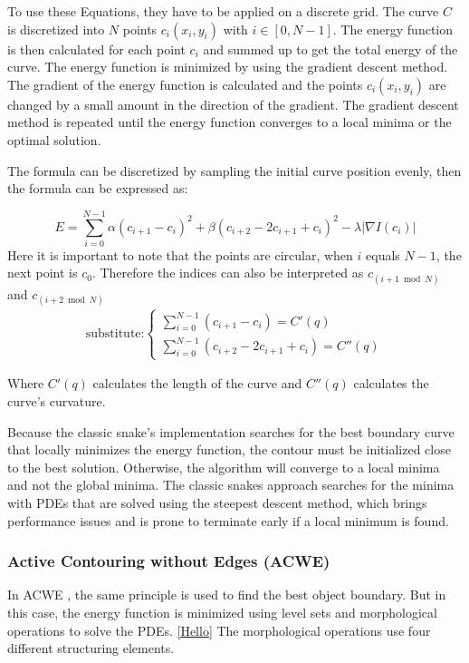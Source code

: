 To use these Equations, they have to be applied on a discrete grid. The curve $C$ is discretized into $N$ points  $c_i(x_i,y_i)$ with $i \in [0, N-1]$. The energy function is then calculated for each point $c_i$ and summed up to get the total energy of the curve. The energy function is minimized by using the gradient descent method. The gradient of the energy function is calculated and the points $c_i(x_i,y_i)$ are changed by a small amount in the direction of the gradient. The gradient descent method is repeated until the energy function converges to a local minima or the optimal solution. 

The formula can be discretized by sampling the initial curve position evenly, then the formula can be expressed as: 

\begin{equation}
    E = \sum_{i=0}^{N-1} \alpha (c_{i+1} - c_i)^2 + \beta (c_{i+2} - 2c_{i+1} + c_i)^2 - \lambda |\nabla I (c_i)|
\end{equation}
Here it is important to note that the points are circular, when $i$ equals $N-1$, the next point is $c_0$. Therefore the indices can also be interpreted as $c_{(i+1 \bmod N)}$ and $c_{(i+2 \bmod N)}$
\begin{align*}
    \text {substitute:} \begin{cases}
    \sum_{i=0}^{N-1}(c_{i+1} - c_i) = C'(q) \\
    \sum_{i=0}^{N-1}(c_{i+2} - 2c_{i+1} + c_i) = C''(q)
    \end{cases}
\end{align*}

Where $C'(q)$ calculates the length of the curve and $C''(q)$ calculates the curve's curvature.  

Because the classic snake's implementation searches for the best boundary curve that locally minimizes the energy function, the contour must be initialized close to the best solution. Otherwise, the algorithm will converge to a local minima and not the global minima. The classic snakes approach searches for the minima with PDEs that are solved using the steepest descent method, which brings performance issues and is prone to terminate early if a local minimum is found. 

\subsubsection{Active Contouring without Edges (ACWE) }
\label{sus:acwe}
In ACWE \cite{vondracek_image_2018}, the same principle is used to find the best object boundary. But in this case, the energy function is minimized using level sets and morphological operations to solve the PDEs. \ref{Hello} The morphological operations use four different structuring elements. 

